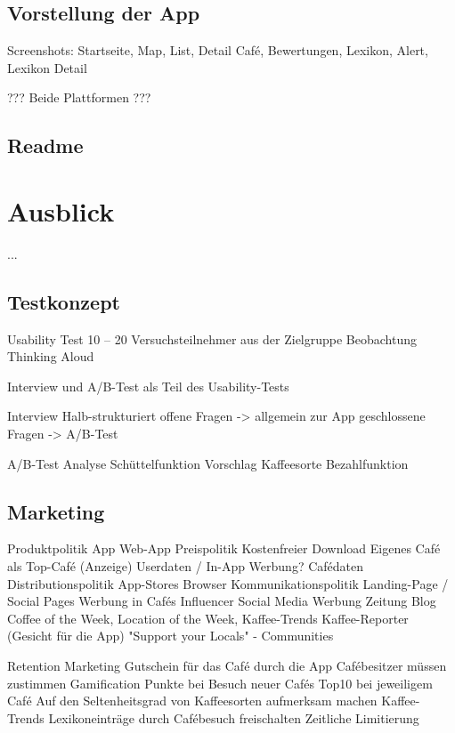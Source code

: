 \section{Vorstellung der App}
Screenshots: Startseite, Map, List, Detail Café, Bewertungen, Lexikon, Alert, Lexikon Detail

??? Beide Plattformen ???


\section{Readme}






\chapter{Ausblick}
\label{ausblick}
...


\section{Testkonzept}

Usability Test
10 – 20 Versuchsteilnehmer aus der Zielgruppe
Beobachtung
Thinking Aloud

Interview und A/B-Test als Teil des Usability-Tests


Interview
Halb-strukturiert
offene Fragen -> allgemein zur App
geschlossene Fragen ->   A/B-Test

A/B-Test
Analyse Schüttelfunktion
Vorschlag Kaffeesorte
Bezahlfunktion



\section{Marketing}
Produktpolitik
App
Web-App
Preispolitik
Kostenfreier Download
Eigenes Café als Top-Café (Anzeige)
Userdaten / In-App Werbung?
Cafédaten
Distributionspolitik
App-Stores
Browser
Kommunikationspolitik
Landing-Page / Social Pages
Werbung in Cafés
Influencer
Social Media Werbung
Zeitung
Blog
Coffee of the Week, Location of the Week, Kaffee-Trends
Kaffee-Reporter (Gesicht für die App)
"Support your Locals" - Communities

Retention Marketing
Gutschein für das Café durch die App
Cafébesitzer müssen zustimmen
Gamification
Punkte bei Besuch neuer Cafés
Top10 bei jeweiligem Café
Auf den Seltenheitsgrad von Kaffeesorten aufmerksam machen
Kaffee-Trends
Lexikoneinträge durch Cafébesuch freischalten
Zeitliche Limitierung

